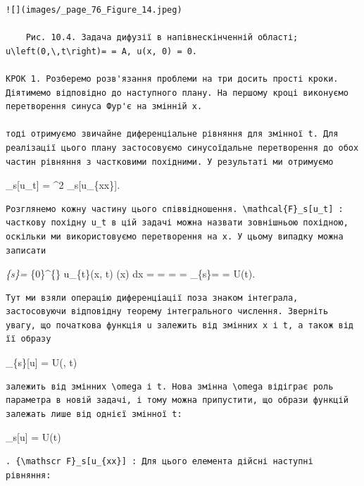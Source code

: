 \documentclass[
  ukrainian,
]{article}
\begin{document}
\begin{verbatim}
![](images/_page_76_Figure_14.jpeg)

    Рис. 10.4. Задача дифузії в напівнескінченній області; u\left(0,\,t\right)= = A, u(x, 0) = 0.

КРОК 1. Розберемо розв'язання проблеми на три досить прості кроки. Діятимемо відповідно до наступного плану. На першому кроці виконуємо перетворення синуса Фур'є на змінній x.

тоді отримуємо звичайне диференціальне рівняння для змінної t. Для реалізації цього плану застосовуємо синусоїдальне перетворення до обох частин рівняння з частковими похідними. У результаті ми отримуємо
\end{verbatim}

\_s{[}u\_t{]} = \alpha\^{}2 \_s{[}u\_\{xx\}{]}.

\begin{verbatim}
Розглянемо кожну частину цього співвідношення. \mathcal{F}_s[u_t] : часткову похідну u_t в цій задачі можна назвати зовнішньою похідною, оскільки ми використовуємо перетворення на x. У цьому випадку можна записати
\end{verbatim}

\emph{\{s\}\left[u_{t}\right] = 
\int}\{0\}\^{}\{\infty\} u\_\{t\}\left(x, t\right)
\sin\left(\omega x\right) dx = = 
 =
=  \_\{s\}\left[u\right] = = 
U\left(t\right).

\begin{verbatim}
Тут ми взяли операцію диференціації поза знаком інтеграла, застосовуючи відповідну теорему інтегрального числення. Зверніть увагу, що початкова функція u залежить від змінних x і t, а також від її образу
\end{verbatim}

\_\{s\}{[}u{]} = U(\omega, t)

\begin{verbatim}
залежить від змінних \omega і t. Нова змінна \omega відіграє роль параметра в новій задачі, і тому можна припустити, що образи функцій залежать лише від однієї змінної t:
\end{verbatim}

\_s{[}u{]} = U(t)

\begin{verbatim}
. {\mathscr F}_s[u_{xx}] : Для цього елемента дійсні наступні рівняння:
\end{verbatim}
\end{document}
